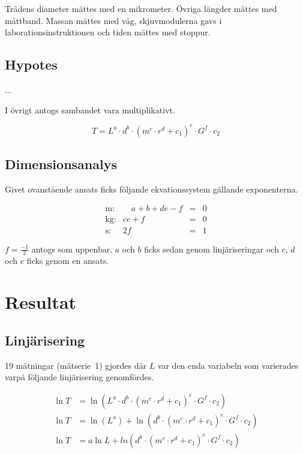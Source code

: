 \documentclass[a4paper,12pt]{article}
\begin{document}
Trådens diameter mättes med en mikrometer. Övriga längder mättes med måttband.
Massan mättes med våg, skjuvmodulerna gavs i laborationsinstruktionen och
tiden mättes med stoppur.

\subsection{Hypotes}

...

I övrigt antogs sambandet vara multiplikativt.

\begin{equation}
  T = L^a \cdot d^b \cdot (m^c \cdot r^d + c_1)^e \cdot G^f \cdot c_2
\end{equation}

\subsection{Dimensionsanalys}

Givet ovanstående ansats ficks följande ekvationssystem gällande exponenterna.

\begin{equation}
  \begin{array}{rrcc}
    \text{m:} & \hspace{1em} a + b + de - f & = & 0 \\
    \text{kg:} & c e + f & = & 0 \\
    \text{s:} & 2f & = & 1
  \end{array}
  \label{eq:system}
\end{equation}

$f = \frac{-1}{2}$ antogs som uppenbar. $a$ och $b$ ficks sedan genom
linjäriseringar och $c$, $d$ och $e$ ficks genom en ansats.

\section{Resultat}

\subsection{Linjärisering}

19 mätningar (mätserie~1) gjordes där $L$ var den enda variabeln som varierades
varpå följande linjärisering genomfördes.

\begin{align}
  \ln T &= \ln (L^a \cdot d^b \cdot (m^c \cdot r^d + c_1)^e \cdot G^f \cdot c_2) \nonumber \\
  \ln T &= \ln (L^a) + \ln (d^b \cdot (m^c \cdot r^d + c_1)^e \cdot G^f \cdot c_2) \nonumber \\
  \ln T &= a\ln L + ln (d^b \cdot (m^c \cdot r^d + c_1)^e \cdot G^f \cdot c_2)  \label{eq:lin_La}
\end{align}
\end{document}
